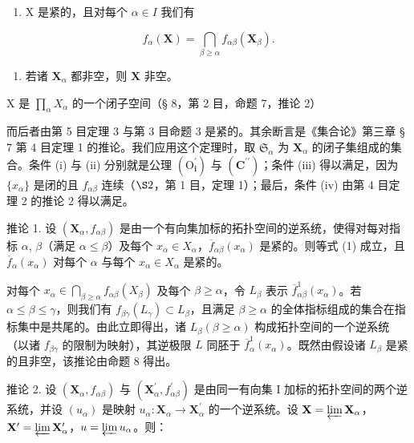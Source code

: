 \begin{enumerate}
\def\labelenumi{\alph{enumi})}
\tightlist
\item
  X 是紧的，且对每个 \(\alpha \in I\) 我们有
\end{enumerate}

\[
f _ {\alpha} (\mathbf {X}) = \bigcap_ {\beta \geqslant \alpha} f _ {\alpha \beta} (\mathbf {X} _ {\beta}).\tag{I}
\]

\begin{enumerate}
\def\labelenumi{\alph{enumi})}
\setcounter{enumi}{1}
\tightlist
\item
  若诸 \(\mathbf{X}_{\alpha}\) 都非空，则 \(\mathbf{X}\) 非空。
\end{enumerate}

X 是 \(\prod_{\alpha} X_{\alpha}\) 的一个闭子空间（§ 8，第 2 目，命题 7，推论 2）

而后者由第 5 目定理 3 与第 3 目命题 3 是紧的。其余断言是《集合论》第三章 § 7 第 4 目定理 1 的推论。我们应用这个定理时，取 \(\mathfrak{S}_{\alpha}\) 为 \(\mathbf{X}_{\alpha}\) 的闭子集组成的集合。条件 (i) 与 (ii) 分别就是公理 \((\mathrm{O}_{\mathbf{i}}^{\prime})\) 与 \((\mathbf{C}^{\prime \prime})\)；条件 (iii) 得以满足，因为 \(\{x_{\alpha}\}\) 是闭的且 \(f_{\alpha \beta}\) 连续（\(\S 2\)，第 1 目，定理 1）；最后，条件 (iv) 由第 4 目定理 2 的推论 2 得以满足。

推论 1. 设 \((\mathbf{X}_{\alpha}, f_{\alpha\beta})\) 是由一个有向集加标的拓扑空间的逆系统，使得对每对指标 \(\alpha\), \(\beta\)（满足 \(\alpha \leqslant \beta\)）及每个 \(x_{\alpha} \in X_{\alpha}\)，\(\overline{f}_{\alpha\beta}(x_{\alpha})\) 是紧的。则等式 (1) 成立，且 \(\overline{f}_{\alpha}(x_{\alpha})\) 对每个 \(\alpha\) 与每个 \(x_{\alpha} \in X_{\alpha}\) 是紧的。

对每个 \(x_{\alpha} \in \bigcap_{\beta \geqslant \alpha} f_{\alpha \beta}(X_{\beta})\) 及每个 \(\beta \geqslant \alpha\)，令 \(L_{\beta}\) 表示 \(\overline{f}_{\alpha \beta}^{1}(x_{\alpha})\)。若 \(\alpha \leqslant \beta \leqslant \gamma\)，则我们有 \(f_{\beta \gamma}(L_{\gamma}) \subset L_{\beta}\)，且满足 \(\beta \geqslant \alpha\) 的全体指标组成的集合在指标集中是共尾的。由此立即得出，诸 \(L_{\beta} (\beta \geqslant \alpha)\) 构成拓扑空间的一个逆系统（以诸 \(f_{\beta \gamma}\) 的限制为映射），其逆极限 \(L\) 同胚于 \(\overline{f}_{\alpha}^{1}(x_{\alpha})\)。既然由假设诸 \(L_{\beta}\) 是紧的且非空，该推论由命题 8 得出。

推论 2. 设 \((\mathbf{X}_{\alpha}, f_{\alpha \beta})\) 与 \((\mathbf{X}_{\alpha}^{\prime}, f_{\alpha \beta}^{\prime})\) 是由同一有向集 I 加标的拓扑空间的两个逆系统，并设 \((u_{\alpha})\) 是映射 \(u_{\alpha}: \mathbf{X}_{\alpha} \to \mathbf{X}_{\alpha}^{\prime}\) 的一个逆系统。设 \(\mathbf{X} = \varprojlim \mathbf{X}_{\alpha}\)，\(\mathbf{X}^{\prime} = \varprojlim \mathbf{X}_{\alpha}^{\prime}\)，\(u = \varprojlim u_{\alpha}\)。则：

